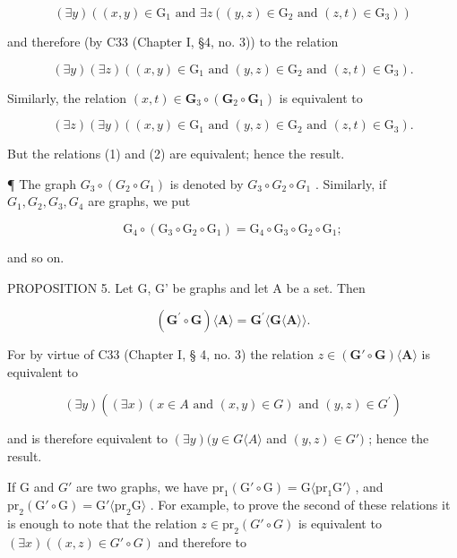 \[
(\exists y) ((x, y) \in \mathrm{G} _ {1} \text {   and   } \exists z ((y, z) \in \mathrm{G} _ {2} \text {   and   } (z, t) \in \mathrm{G} _ {3}))
\]

and therefore (by C33 (Chapter I, §4, no. 3)) to the relation

\[
(\exists y) (\exists z) ((x, y) \in \mathrm{G} _ {1} \text {   and   } (y, z) \in \mathrm{G} _ {2} \text {   and   } (z, t) \in \mathrm{G} _ {3}).\tag{1}
\]

Similarly, the relation \((x, t) \in \mathbf{G}_3 \circ (\mathbf{G}_2 \circ \mathbf{G}_1)\) is equivalent to

\[
(\exists z) (\exists y) ((x, y) \in \mathrm{G} _ {1} \text {   and   } (y, z) \in \mathrm{G} _ {2} \text {   and   } (z, t) \in \mathrm{G} _ {3}).\tag{2}
\]

But the relations (1) and (2) are equivalent; hence the result.

¶ The graph \(G_{3} \circ (G_{2} \circ G_{1})\) is denoted by \(G_{3} \circ G_{2} \circ G_{1}\) . Similarly, if \(G_{1}, G_{2}, G_{3}, G_{4}\) are graphs, we put

\[
\mathrm{G} _ {4} \circ (\mathrm{G} _ {3} \circ \mathrm{G} _ {2} \circ \mathrm{G} _ {1}) = \mathrm{G} _ {4} \circ \mathrm{G} _ {3} \circ \mathrm{G} _ {2} \circ \mathrm{G} _ {1};
\]

and so on.

PROPOSITION 5. Let G, G' be graphs and let A be a set. Then

\[
(\mathbf {G} ^ {\prime} \circ \mathbf {G}) \langle \mathbf {A} \rangle = \mathbf {G} ^ {\prime} \langle \mathbf {G} \langle \mathbf {A} \rangle \rangle .
\]

For by virtue of C33 (Chapter I, § 4, no. 3) the relation \(z \in (\mathbf{G}' \circ \mathbf{G})\langle \mathbf{A} \rangle\) is equivalent to

\[
(\exists y) ((\exists x) (x \in A \text {   and   } (x, y) \in G) \text {   and   } (y, z) \in G ^ {\prime})
\]

and is therefore equivalent to \((\exists y)(y \in G \langle A \rangle\) and \((y, z) \in G')\) ; hence the result.

If G and \(G'\) are two graphs, we have \(\mathrm{pr}_{1}(\mathrm{G}' \circ \mathrm{G}) = \mathrm{G}\langle\mathrm{pr}_{1}\mathrm{G}'\rangle\) , and \(\mathrm{pr}_{2}(\mathrm{G}' \circ \mathrm{G}) = \mathrm{G}'\langle\mathrm{pr}_{2}\mathrm{G}\rangle\) . For example, to prove the second of these relations it is enough to note that the relation \(z \in \mathrm{pr}_2(G' \circ G)\) is equivalent to \((\exists x)((x, z) \in G' \circ G)\) and therefore to

